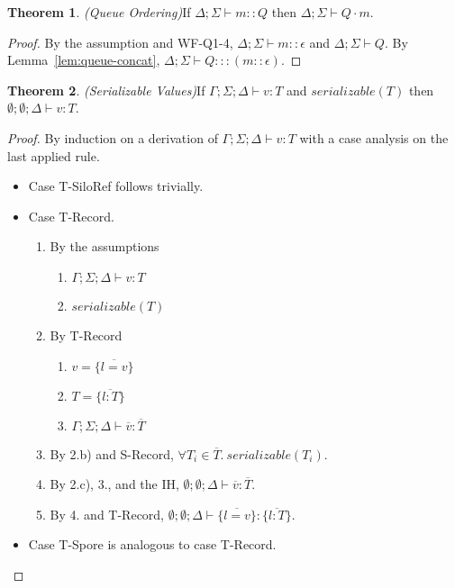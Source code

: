 \documentclass{article}
\theoremstyle{definition}
\newtheorem{thm}{Theorem}[section]
\newcommand{\seq}[1]{\overline{#1}}
\begin{document}
\begin{thm}
\emph{(Queue Ordering)}\label{lem:queue-ordering}
If $\Delta ; \Sigma \vdash m :: Q$ then $\Delta ; \Sigma \vdash Q \cdot m$.
\end{thm}
\begin{proof}
By the assumption and WF-Q1-4, $\Delta ; \Sigma \vdash m :: \epsilon$ and $\Delta ; \Sigma \vdash Q$. By Lemma~\ref{lem:queue-concat}, $\Delta ; \Sigma \vdash Q ::: (m :: \epsilon)$.
\end{proof}

\begin{thm}
\emph{(Serializable Values)}\label{lem:ser-values}
If $\Gamma ; \Sigma ; \Delta \vdash v : T$ and $serializable(T)$ then $\emptyset ; \emptyset ; \Delta \vdash v : T$.
\end{thm}
\begin{proof}
By induction on a derivation of $\Gamma ; \Sigma ; \Delta \vdash v : T$ with a case analysis on the last applied rule.

\begin{itemize}
\item Case T-SiloRef follows trivially.

\item Case T-Record.
\begin{enumerate}
\item By the assumptions
  \begin{enumerate}[label=(\alph*)]
  \item $\Gamma ; \Sigma ; \Delta \vdash v : T$
  \item $serializable(T)$
  \end{enumerate}
\item By T-Record
  \begin{enumerate}[label=(\alph*)]
  \item $v = \{\seq{l = v}\}$
  \item $T = \{\seq{l : T}\}$
  \item $\Gamma ; \Sigma ; \Delta \vdash \seq{v} : \seq{T}$
  \end{enumerate}
\item By 2.b) and S-Record, $\forall T_i \in \seq{T}.~serializable(T_i)$.
\item By 2.c), 3., and the IH, $\emptyset ; \emptyset ; \Delta \vdash \seq{v} : \seq{T}$.
\item By 4. and T-Record, $\emptyset ; \emptyset ; \Delta \vdash \{\seq{l = v}\} : \{\seq{l : T}\}$.
\end{enumerate}

\item Case T-Spore is analogous to case T-Record.
\end{itemize}
\end{proof}
\end{document}
